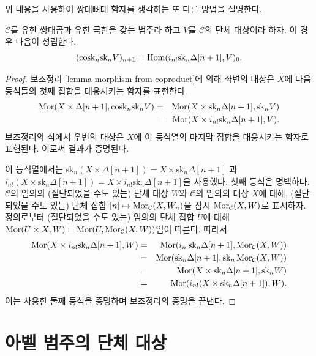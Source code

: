 \noindent
위 내용을 사용하여 쌍대뼈대 함자를 생각하는 또 다른 방법을 설명한다.

\begin{lemma}
\label{lemma-cosk-shriek}
$\mathcal{C}$를 유한 쌍대곱과 유한 극한을 갖는 범주라 하고 $V$를
$\mathcal{C}$의 단체 대상이라 하자. 이 경우 다음이 성립한다.
$$
(\text{cosk}_n \text{sk}_n V)_{n + 1}
=
\mathop{\mathrm{Hom}}\nolimits(i_{n !}\text{sk}_n \Delta[n + 1], V)_0.
$$
\end{lemma}

\begin{proof}
보조정리 \ref{lemma-morphism-from-coproduct}에 의해 좌변의 대상은 $X$에
다음 등식들의 첫째 집합을 대응시키는 함자를 표현한다.
\begin{eqnarray*}
\mathop{\mathrm{Mor}}\nolimits(X \times \Delta[n + 1], \text{cosk}_n \text{sk}_n V)
& = &
\mathop{\mathrm{Mor}}\nolimits(X \times \text{sk}_n \Delta[n + 1], \text{sk}_n V) \\
& = &
\mathop{\mathrm{Mor}}\nolimits(X \times i_{n !} \text{sk}_n \Delta[n + 1], V).
\end{eqnarray*}
보조정리의 식에서 우변의 대상은 $X$에 이 등식열의 마지막 집합을
대응시키는 함자로 표현된다. 이로써 결과가 증명된다.

\medskip\noindent
이 등식열에서는
$\text{sk}_n (X \times \Delta[n + 1]) = X \times \text{sk}_n \Delta[n + 1]$
과
$i_{n!}(X \times \text{sk}_n \Delta[n + 1]) =
X \times i_{n !} \text{sk}_n \Delta[n + 1]$을 사용했다.
첫째 등식은 명백하다. $\mathcal{C}$의 임의의 (절단되었을 수도 있는)
단체 대상 $W$와 $\mathcal{C}$의 임의의 대상 $X$에 대해,
(절단되었을 수도 있는) 단체 집합
$[n] \mapsto \mathop{\mathrm{Mor}}\nolimits_\mathcal{C}(X, W_n)$을 잠시
$\mathop{\mathrm{Mor}}\nolimits_\mathcal{C}(X, W)$로 표시하자. 정의로부터 (절단되었을 수도 있는)
임의의 단체 집합 $U$에 대해
$\mathop{\mathrm{Mor}}\nolimits(U \times X, W) =
\mathop{\mathrm{Mor}}\nolimits(U, \mathop{\mathrm{Mor}}\nolimits_\mathcal{C}(X, W))$임이 따른다. 따라서
\begin{eqnarray*}
\mathop{\mathrm{Mor}}\nolimits(X \times i_{n !} \text{sk}_n \Delta[n + 1], W)
& = &
\mathop{\mathrm{Mor}}\nolimits(i_{n !} \text{sk}_n \Delta[n + 1], \mathop{\mathrm{Mor}}\nolimits_\mathcal{C}(X, W)) \\
& = &
\mathop{\mathrm{Mor}}\nolimits(\text{sk}_n \Delta[n + 1],
\text{sk}_n\mathop{\mathrm{Mor}}\nolimits_\mathcal{C}(X, W)) \\
& = &
\mathop{\mathrm{Mor}}\nolimits(X \times \text{sk}_n \Delta[n + 1], \text{sk}_nW) \\
& = &
\mathop{\mathrm{Mor}}\nolimits(i_{n!}(X \times \text{sk}_n \Delta[n + 1]), W).
\end{eqnarray*}
이는 사용한 둘째 등식을 증명하며 보조정리의 증명을 끝낸다.
\end{proof}


\section{아벨 범주의 단체 대상}
\label{section-abelian}

